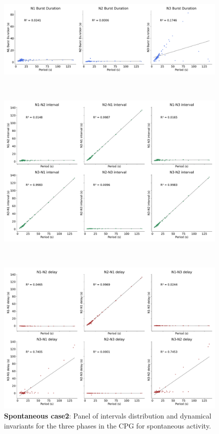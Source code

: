 \begin{figure}[htbp]
\begin{minipage}[b]{0.53\textwidth}
		\begin{minipage}[b]{\textwidth}
			\centering
			\includegraphics[width=\textwidth]{./invariants/data/SUSSEX/prep2/images/spontaneous_durations.pdf}
		\end{minipage}\\
		\begin{minipage}[b]{\textwidth}
			\centering
			\includegraphics[width=\textwidth]{./invariants/data/SUSSEX/prep2/images/spontaneous_intervals.pdf}
		\end{minipage}\\
		\begin{minipage}[b]{\textwidth}
			\centering
			\includegraphics[width=\textwidth]{./invariants/data/SUSSEX/prep2/images/spontaneous_delays.pdf}
		\end{minipage}
	\end{minipage}
	\caption{\textbf{Spontaneous case2}: Panel of intervals distribution and dynamical invariants for the three phases in the CPG for spontaneous activity.}
	\label{fig:prep2 invariants}
\end{figure}


